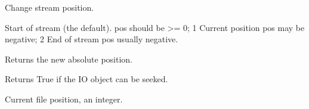 \documentclass[letterpaper,10pt,english]{sphinxmanual}
\begin{document}
\begin{fulllineitems}
\begin{fulllineitems}
\label{\detokenize{modules/src.pig_sorting_streamlit.app:src.pig_sorting_streamlit.app.BytesIO.seek}}
\pysigstartsignatures
\pysiglinewithargsret
{}
{\sphinxparamcomma {}\sphinxparamcomma {}}
{}
\pysigstopsignatures
\sphinxAtStartPar
Change stream position.
\begin{description}
  Start of stream (the default).  pos should be \textgreater{}= 0;
1  Current position \sphinxhyphen{} pos may be negative;
2  End of stream \sphinxhyphen{} pos usually negative.

\end{description}

\sphinxAtStartPar
Returns the new absolute position.

\end{fulllineitems}


\begin{fulllineitems}
\label{\detokenize{modules/src.pig_sorting_streamlit.app:src.pig_sorting_streamlit.app.BytesIO.seekable}}
\pysigstartsignatures
\pysiglinewithargsret
{}
{}
{}
\pysigstopsignatures
\sphinxAtStartPar
Returns True if the IO object can be seeked.

\end{fulllineitems}


\begin{fulllineitems}
\label{\detokenize{modules/src.pig_sorting_streamlit.app:src.pig_sorting_streamlit.app.BytesIO.tell}}
\pysigstartsignatures
\pysiglinewithargsret
{}
{}
{}
\pysigstopsignatures
\sphinxAtStartPar
Current file position, an integer.

\end{fulllineitems}



\end{fulllineitems}
\end{document}
